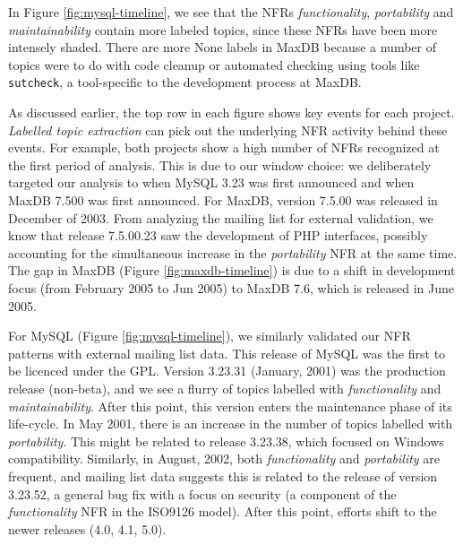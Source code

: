 \documentclass[]{sig-alternate}
\begin{document}
In Figure \ref{fig:mysql-timeline}, we see that the NFRs \emph{functionality}, \emph{portability} and \emph{maintainability} contain more labeled topics, since these NFRs have been more intensely shaded. %
There are more \textsf{None} labels in MaxDB because a number of topics were to do with code cleanup or automated checking using tools like \texttt{sutcheck}, a tool-specific to the development process at MaxDB. 

As discussed earlier, the top row in each figure shows key events for each project. 
\textit{Labelled topic extraction} can pick out the underlying NFR activity behind these events. 
For example, both projects show a high number of NFRs recognized at the first period of analysis. 
This is due to our window choice: we deliberately targeted our analysis to when MySQL 3.23 was first announced %
and when MaxDB 7.500 was first announced. For MaxDB, version 7.5.00  was released in December of 2003. 
From analyzing the mailing list for external validation, we know that release 7.5.00.23 saw the development of PHP interfaces, possibly accounting for the simultaneous increase in the \emph{portability} NFR at the same time.
The gap in MaxDB (Figure \ref{fig:maxdb-timeline}) is due to a shift in development focus (from February 2005 to Jun 2005) to MaxDB 7.6, which is released in June 2005.

For MySQL (Figure \ref{fig:mysql-timeline}), we similarly validated our NFR patterns with external mailing list data. 
This release of MySQL was the first to be licenced under the GPL. 
Version 3.23.31 (January, 2001) was the production release (non-beta), and we see a flurry of topics labelled with \emph{functionality} and \emph{maintainability}. 
After this point, this version enters the maintenance phase of its life-cycle. 
In May 2001, there is an increase in the number of topics labelled with \emph{portability}. 
This might be related to release 3.23.38, which focused on Windows compatibility. 
Similarly, in August, 2002, both \emph{functionality} and \emph{portability} are frequent, and mailing list data suggests this is related to the release of version 3.23.52, a general bug fix with a focus on security (a component of the \emph{functionality} NFR in the ISO9126 model). 
After this point, efforts shift to the newer releases (4.0, 4.1, 5.0). 
\end{document}
